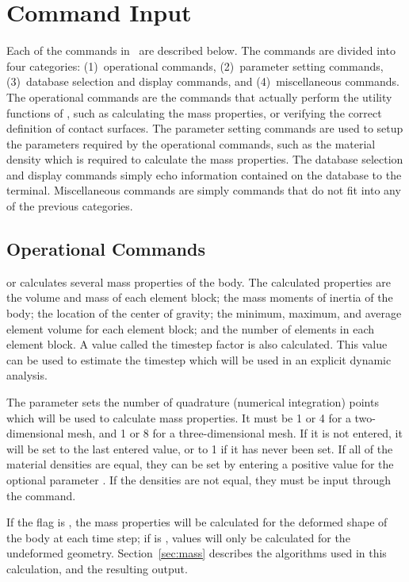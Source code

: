\chapter{Command Input} \label{chap:command}

Each of the commands in \numbers\ are described below.  The commands are
divided into four categories: (1)~operational commands, (2)~parameter
setting commands, (3)~database selection and display commands, and
(4)~miscellaneous commands.  The operational commands are the commands
that actually perform the utility functions of \numbers, such as
calculating the mass properties, or verifying the correct definition of
contact surfaces.  The parameter setting commands are used to setup the
parameters required by the operational commands, such as the material
density which is required to calculate the mass properties.  The
database selection and display commands simply echo information
contained on the database to the terminal.  Miscellaneous commands are
simply commands that do not fit into any of the previous categories.



\newpage
\section{Operational Commands}\label{sec:oper}

 {
  or  calculates several mass properties of
the body.  The calculated properties are the volume and mass of each
element block; the mass moments of inertia of the body; the
location of the center of gravity; the minimum, maximum, and average
element volume for each element block; and the number of elements in
each element block.   A value called the timestep factor is also
calculated.  This value can be used to estimate the timestep which will
be used in an explicit dynamic analysis.

The parameter  sets the number of quadrature (numerical
integration) points which will be used to calculate mass properties. It
must be 1 or 4 for a two-dimensional mesh, and 1 or 8 for a
three-dimensional mesh.  If it is not entered, it will be set to the
last entered value, or to 1 if it has never been set.  If all of the
material densities are equal, they can be set by entering a positive
value for the optional parameter . If the densities are
not equal, they must be input through the  command.

If the  flag is , the mass properties will be
calculated for the deformed shape of the body at each time step; if
 is , values will only be calculated for the
undeformed geometry.  Section~\ref{sec:mass} describes the algorithms
used in this calculation, and the resulting output.
}

